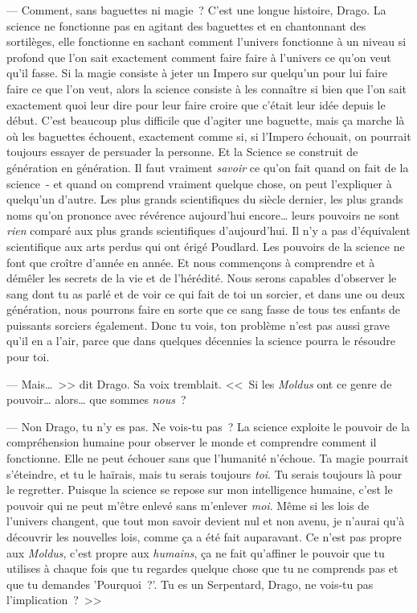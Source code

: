 --- Comment, sans baguettes ni magie~? C'est une longue histoire, Drago. La science ne fonctionne pas en agitant des baguettes et en chantonnant des sortilèges, elle fonctionne en sachant comment l'univers fonctionne à un niveau si profond que l'on sait exactement comment faire faire à l'univers ce qu'on veut qu'il fasse. Si la magie consiste à jeter un Impero sur quelqu'un pour lui faire faire ce que l'on veut, alors la science consiste à les connaître si bien que l'on sait exactement quoi leur dire pour leur faire croire que c'était leur idée depuis le début. C'est beaucoup plus difficile que d'agiter une baguette, mais ça marche là où les baguettes échouent, exactement comme si, si l'Impero échouait, on pourrait toujours essayer de persuader la personne. Et la Science se construit de génération en génération. Il faut vraiment \emph{savoir} ce qu'on fait quand on fait de la science~- et quand on comprend vraiment quelque chose, on peut l'expliquer à quelqu'un d'autre. Les plus grands scientifiques du siècle dernier, les plus grands noms qu'on prononce avec révérence aujourd'hui encore… leurs pouvoirs ne sont \emph{rien} comparé aux plus grands scientifiques d'aujourd'hui. Il n'y a pas d'équivalent scientifique aux arts perdus qui ont érigé Poudlard. Les pouvoirs de la science ne font que croître d'année en année. Et nous commençons à comprendre et à démêler les secrets de la vie et de l'hérédité. Nous serons capables d'observer le sang dont tu as parlé et de voir ce qui fait de toi un sorcier, et dans une ou deux génération, nous pourrons faire en sorte que ce sang fasse de tous tes enfants de puissants sorciers également. Donc tu vois, ton problème n'est pas aussi grave qu'il en a l'air, parce que dans quelques décennies la science pourra le résoudre pour toi.

--- Mais…~>> dit Drago. Sa voix tremblait. <<~Si les \emph{Moldus} ont ce genre de pouvoir… alors… que sommes \emph{nous}~?

--- Non Drago, tu n'y es pas. Ne vois-tu pas~? La science exploite le pouvoir de la compréhension humaine pour observer le monde et comprendre comment il fonctionne. Elle ne peut échouer sans que l'humanité n'échoue. Ta magie pourrait s'éteindre, et tu le haïrais, mais tu serais toujours \emph{toi}. Tu serais toujours là pour le regretter. Puisque la science se repose sur mon intelligence humaine, c'est le pouvoir qui ne peut m'être enlevé sans m'enlever \emph{moi}. Même si les lois de l'univers changent, que tout mon savoir devient nul et non avenu, je n'aurai qu'à découvrir les nouvelles lois, comme ça a été fait auparavant. Ce n'est pas propre aux \emph{Moldus}, c'est propre aux \emph{humains}, ça ne fait qu'affiner le pouvoir que tu utilises à chaque fois que tu regardes quelque chose que tu ne comprends pas et que tu demandes 'Pourquoi~?'. Tu es un Serpentard, Drago, ne vois-tu pas l'implication~?~>>

